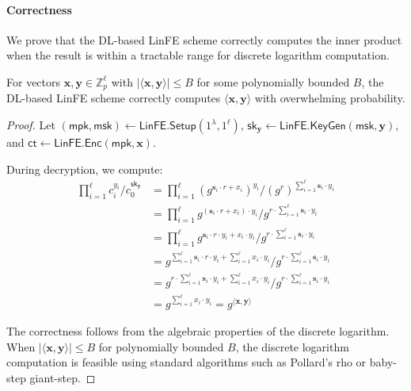 \paragraph{Correctness}
We prove that the DL-based LinFE scheme correctly computes the inner product when the result is within a tractable range for discrete logarithm computation.

\begin{thm}
For vectors $\mathbf{x}, \mathbf{y} \in \mathbb{Z}_p^\ell$ with $|\langle \mathbf{x}, \mathbf{y} \rangle| \leq B$ for some polynomially bounded $B$, the DL-based LinFE scheme correctly computes $\langle \mathbf{x}, \mathbf{y} \rangle$ with overwhelming probability.
\end{thm}

\begin{proof}
Let $(\mathsf{mpk}, \mathsf{msk}) \leftarrow \mathsf{LinFE.Setup}(1^\lambda, 1^\ell)$, $\mathsf{sk}_{\mathbf{y}} \leftarrow \mathsf{LinFE.KeyGen}(\mathsf{msk}, \mathbf{y})$, and $\mathsf{ct} \leftarrow \mathsf{LinFE.Enc}(\mathsf{mpk}, \mathbf{x})$.

During decryption, we compute:
\begin{align*}
\prod_{i=1}^\ell c_i^{y_i}/c_0^{\mathsf{sk}_{\mathbf{y}}} &= \prod_{i=1}^\ell (g^{\mathbf{s}_i \cdot r + x_i})^{y_i}/(g^r)^{\sum_{i=1}^\ell \mathbf{s}_i \cdot y_i} \\
&= \prod_{i=1}^\ell g^{(\mathbf{s}_i \cdot r + x_i) \cdot y_i}/g^{r \cdot \sum_{i=1}^\ell \mathbf{s}_i \cdot y_i} \\
&= \prod_{i=1}^\ell g^{\mathbf{s}_i \cdot r \cdot y_i + x_i \cdot y_i}/g^{r \cdot \sum_{i=1}^\ell \mathbf{s}_i \cdot y_i} \\
&= g^{\sum_{i=1}^\ell \mathbf{s}_i \cdot r \cdot y_i + \sum_{i=1}^\ell x_i \cdot y_i}/g^{r \cdot \sum_{i=1}^\ell \mathbf{s}_i \cdot y_i} \\
&= g^{r \cdot \sum_{i=1}^\ell \mathbf{s}_i \cdot y_i + \sum_{i=1}^\ell x_i \cdot y_i}/g^{r \cdot \sum_{i=1}^\ell \mathbf{s}_i \cdot y_i} \\
&= g^{\sum_{i=1}^\ell x_i \cdot y_i} = g^{\langle \mathbf{x}, \mathbf{y} \rangle}
\end{align*}

The correctness follows from the algebraic properties of the discrete logarithm. When $|\langle \mathbf{x}, \mathbf{y} \rangle| \leq B$ for polynomially bounded $B$, the discrete logarithm computation is feasible using standard algorithms such as Pollard's rho or baby-step giant-step.
\end{proof}

